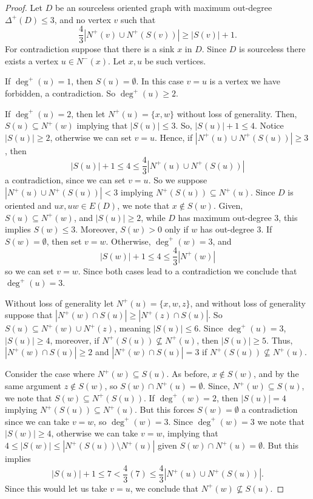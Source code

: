 \documentclass[12pt]{article}
\theoremstyle{definition}
\begin{document}
\begin{proof}
    Let $D$ be an sourceless oriented graph with maximum out-degree $\Delta^+(D)\leq 3$,
   and no vertex $v$ such that 
    \[
    \frac{4}{3}|N^+(v) \cup N^+(S(v))| \geq |S(v)|+1.
    \]
    For contradiction suppose that there is a sink $x$ in $D$.
    Since $D$ is sourceless there exists a vertex $u \in N^-(x)$.
    Let $x,u$ be such vertices.


    If $\deg^+(u) = 1$, then $S(u) = \emptyset$.
    In this case $v = u$ is a vertex we have forbidden, a contradiction.
    So $\deg^+(u) \geq 2$.

    
    If $\deg^+(u) = 2$, then let $N^+(u) = \{x,w\}$ without loss of generality.
    Then, $S(u) \subseteq N^+(w)$ implying that $|S(u)| \leq 3$.
    So, $|S(u)| + 1 \leq 4$.
    Notice $|S(u)|\geq 2$, otherwise we can set $v = u$.
    Hence, if $|N^+(u) \cup N^+(S(u))| \geq 3$, then 
    \[
    |S(u)| + 1 \leq 4 \leq \frac{4}{3} |N^+(u) \cup N^+(S(u))|
    \]
    a contradiction, since we can set $v = u$. 
    So we suppose $|N^+(u) \cup N^+(S(u))| < 3$ implying $N^+(S(u)) \subseteq N^+(u)$.
    Since $D$ is oriented and $ux,uw \in E(D)$,
    we note that $x \notin S(w)$.
    Given, $S(u) \subseteq N^+(w)$, and $|S(u)|\geq 2$, while $D$ has maximum out-degree $3$,
    this implies $S(w) \leq 3$.
    Moreover, $S(w)> 0$ only if $w$ has out-degree $3$.
    If $S(w) = \emptyset$, then set $v = w$.
    Otherwise, $\deg^+(w) = 3$, and 
    \[
    |S(w)|+1 \leq 4 \leq \frac{4}{3}|N^+(w)|
    \]
    so we can set $v = w$.
    Since both cases lead to a contradiction
    we conclude that $\deg^+(u) = 3$.


    Without loss of generality let $N^+(u) = \{x,w,z\}$,
    and without loss of generality suppose that $|N^+(w)\cap S(u)|\geq |N^+(z)\cap S(u)|$.
    So $S(u) \subseteq N^+(w) \cup N^+(z)$, meaning $|S(u)|\leq 6$.
    Since $\deg^+(u) = 3$, $|S(u)|\geq 4$,
    moreover, if $N^+(S(u)) \not\subseteq N^+(u)$, then $|S(u)|\geq 5$.
    Thus, $|N^+(w)\cap S(u)| \geq 2$ and $|N^+(w)\cap S(u)| = 3$ if $N^+(S(u)) \not\subseteq N^+(u)$.

    
    Consider the case where $N^+(w)\subseteq S(u)$.
    As before, $x \notin S(w)$, and by the same argument $z \notin S(w)$,
    so $S(w) \cap N^+(u) = \emptyset$.
    Since, $N^+(w)\subseteq S(u)$, we note that $S(w)\subseteq N^+(S(u))$.
    If $\deg^+(w) = 2$, then $|S(u)| = 4$ implying $N^+(S(u)) \subseteq N^+(u)$.
    But this forces $S(w) = \emptyset$ a contradiction since we can take $v = w$,
    so $\deg^+(w) = 3$.
    Since $\deg^+(w) = 3$ we note that $|S(w)|\geq 4$,
    otherwise we can take $v = w$,
    implying that
    $4 \leq |S(w)| \leq |N^+(S(u))\setminus N^+(u)|$ given $S(w) \cap N^+(u) = \emptyset$.
    But this implies 
    \[
    |S(u)| + 1 \leq 7 < \frac{4}{3}(7) \leq \frac{4}{3}|N^+(u) \cup N^+(S(u))|.
    \]
    Since this would let us take $v = u$, we conclude that $N^+(w)\not\subseteq S(u)$.


\end{proof}
\end{document}
